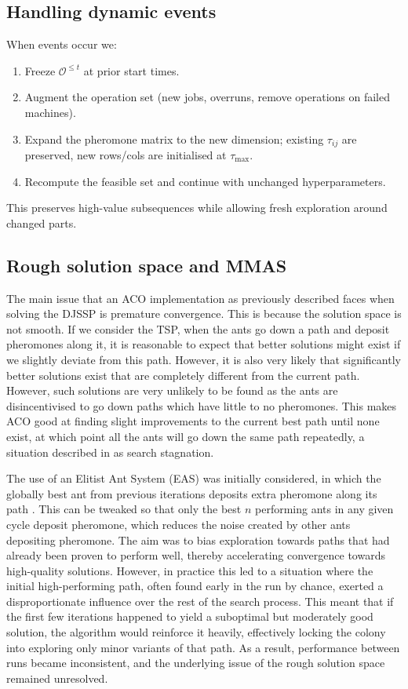 \documentclass[final-report]{report-template}
\begin{document}
\subsection{Handling dynamic events}
When events occur we:
\begin{enumerate}
\item Freeze $\mathcal{O}^{\le t}$ at prior start times.
\item Augment the operation set (new jobs, overruns, remove operations on failed machines).
\item Expand the pheromone matrix to the new dimension; existing $\tau_{ij}$ are preserved, new rows/cols are initialised at $\tau_{\max}$.
\item Recompute the feasible set and continue with unchanged hyperparameters.
\end{enumerate}
This preserves high-value subsequences while allowing fresh exploration around changed parts.

\subsection{Rough solution space and MMAS}
The main issue that an ACO implementation as previously described faces when solving the DJSSP is premature convergence. This is because the solution space is not smooth. If we consider the TSP, when the ants go down a path and deposit pheromones along it, it is reasonable to expect that better solutions might exist if we slightly deviate from this path. However, it is also very likely that significantly better solutions exist that are completely different from the current path. However, such solutions are very unlikely to be found as the ants are disincentivised to go down paths which have little to no pheromones. This makes ACO good at finding slight improvements to the current best path until none exist, at which point all the ants will go down the same path repeatedly, a situation described in \cite{484436} as search stagnation.

The use of an Elitist Ant System (EAS) was initially considered, in which the globally best ant from previous iterations deposits extra pheromone along its path \cite{ABUHAMDAH2021107293}. This can be tweaked so that only the best $n$ performing ants in any given cycle deposit pheromone, which reduces the noise created by other ants depositing pheromone. The aim was to bias exploration towards paths that had already been proven to perform well, thereby accelerating convergence towards high-quality solutions. However, in practice this led to a situation where the initial high-performing path, often found early in the run by chance, exerted a disproportionate influence over the rest of the search process. This meant that if the first few iterations happened to yield a suboptimal but moderately good solution, the algorithm would reinforce it heavily, effectively locking the colony into exploring only minor variants of that path. As a result, performance between runs became inconsistent, and the underlying issue of the rough solution space remained unresolved.
\end{document}
